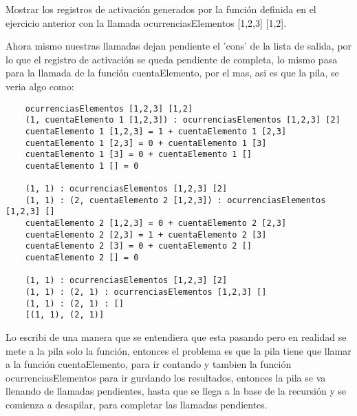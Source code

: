 Mostrar los registros de activación generados por la 
función definida en el ejercicio anterior con la llamada 
ocurrenciasElementos [1,2,3] [1,2].

Ahora mismo nuestras llamadas dejan pendiente el 'cons' 
de la lista de salida, por lo que el registro de activación
se queda pendiente de completa, lo mismo pasa para la llamada
de la función cuentaElemento, por el mas, asi es que la pila,
se veria algo como:
\begin{verbatim}
    ocurrenciasElementos [1,2,3] [1,2]
    (1, cuentaElemento 1 [1,2,3]) : ocurrenciasElementos [1,2,3] [2]
    cuentaElemento 1 [1,2,3] = 1 + cuentaElemento 1 [2,3]
    cuentaElemento 1 [2,3] = 0 + cuentaElemento 1 [3]
    cuentaElemento 1 [3] = 0 + cuentaElemento 1 []
    cuentaElemento 1 [] = 0

    (1, 1) : ocurrenciasElementos [1,2,3] [2]
    (1, 1) : (2, cuentaElemento 2 [1,2,3]) : ocurrenciasElementos [1,2,3] []
    cuentaElemento 2 [1,2,3] = 0 + cuentaElemento 2 [2,3]
    cuentaElemento 2 [2,3] = 1 + cuentaElemento 2 [3]
    cuentaElemento 2 [3] = 0 + cuentaElemento 2 []
    cuentaElemento 2 [] = 0

    (1, 1) : ocurrenciasElementos [1,2,3] [2]
    (1, 1) : (2, 1) : ocurrenciasElementos [1,2,3] []
    (1, 1) : (2, 1) : []
    [(1, 1), (2, 1)]
\end{verbatim}

Lo escribi de una manera que se entendiera que esta pasando 
pero en realidad se mete a la pila solo la función,
entonces el problema es que la pila tiene que llamar a la función
cuentaElemento, para ir contando y tambien la función ocurrenciasElementos
para ir gurdando los resultados, entonces la pila se va llenando de
llamadas pendientes, hasta que se llega a la base de la recursión y se
comienza a desapilar, para completar las llamadas pendientes.

\vspace{.3cm}